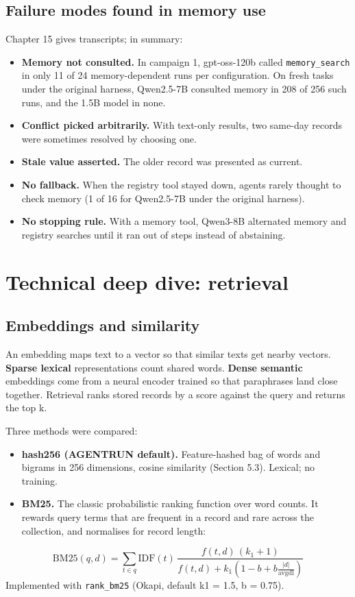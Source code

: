\documentclass[10.5pt,a4paper,oneside]{report}
\begin{document}
\section{Failure modes found in memory use}
Chapter 15 gives transcripts; in summary:

\begin{itemize}
\item \textbf{Memory not consulted.} In campaign 1, gpt-oss-120b called \texttt{memory\_\allowbreak{}search} in only 11 of 24 memory-dependent runs per configuration. On fresh tasks under the original harness, Qwen2.5-7B consulted memory in 208 of 256 such runs, and the 1.5B model in none.
\item \textbf{Conflict picked arbitrarily.} With text-only results, two same-day records were sometimes resolved by choosing one.
\item \textbf{Stale value asserted.} The older record was presented as current.
\item \textbf{No fallback.} When the registry tool stayed down, agents rarely thought to check memory (1 of 16 for Qwen2.5-7B under the original harness).
\item \textbf{No stopping rule.} With a memory tool, Qwen3-8B alternated memory and registry searches until it ran out of steps instead of abstaining.
\end{itemize}
\clearpage
\chapter{Technical deep dive: retrieval}
\section{Embeddings and similarity}
An embedding maps text to a vector so that similar texts get nearby vectors. \textbf{Sparse lexical} representations count shared words. \textbf{Dense semantic} embeddings come from a neural encoder trained so that paraphrases land close together. Retrieval ranks stored records by a score against the query and returns the top k.

Three methods were compared:

\begin{itemize}
\item \textbf{hash256 (AGENTRUN default).} Feature-hashed bag of words and bigrams in 256 dimensions, cosine similarity (Section 5.3). Lexical; no training.
\item \textbf{BM25.} The classic probabilistic ranking function over word counts. It rewards query terms that are frequent in a record and rare across the collection, and normalises for record length:
\end{itemize}
\begin{equation*}\mathrm{BM25}(q, d) = \sum_{t \in q} \mathrm{IDF}(t)\, \frac{f(t,d)\,(k_1 + 1)}{f(t,d) + k_1 \left(1 - b + b \frac{|d|}{\mathrm{avgdl}}\right)}\end{equation*}
Implemented with \texttt{rank\_\allowbreak{}bm25} (Okapi, default k1 = 1.5, b = 0.75).
\end{document}

